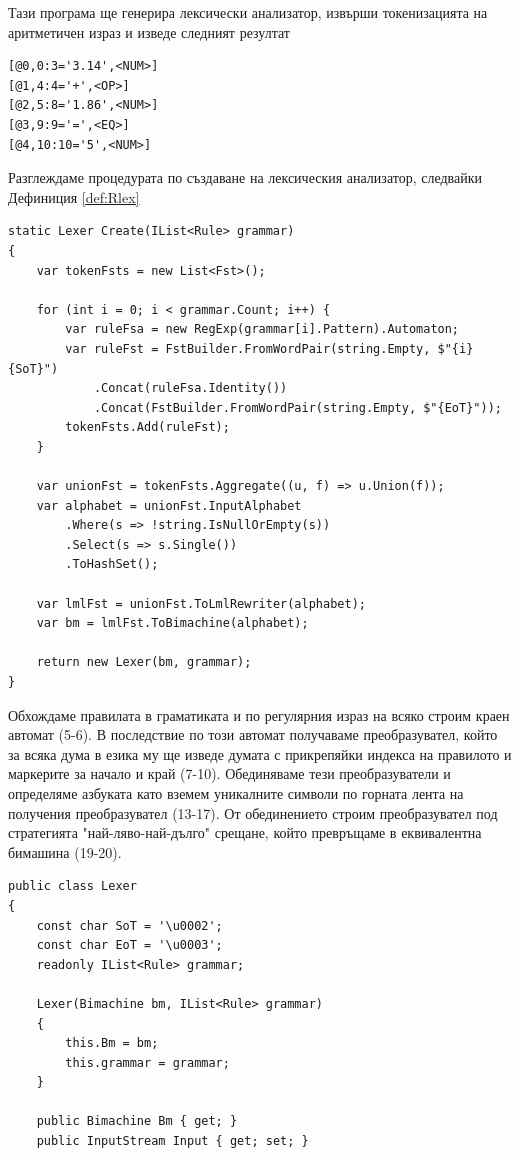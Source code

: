 \documentclass[12pt, oneside]{article}
\theoremstyle{definition}
\begin{document}
Тази програма ще генерира лексически анализатор, извърши токенизацията на аритметичен израз и изведе следният резултат

\begin{verbatim}
[@0,0:3='3.14',<NUM>]
[@1,4:4='+',<OP>]
[@2,5:8='1.86',<NUM>]
[@3,9:9='=',<EQ>]
[@4,10:10='5',<NUM>]
\end{verbatim}

Разглеждаме процедурата по създаване на лексическия анализатор, следвайки Дефиниция \ref{def:Rlex}

\begin{verbatim}
static Lexer Create(IList<Rule> grammar)
{
	var tokenFsts = new List<Fst>();

	for (int i = 0; i < grammar.Count; i++) {
		var ruleFsa = new RegExp(grammar[i].Pattern).Automaton;
		var ruleFst = FstBuilder.FromWordPair(string.Empty, $"{i}{SoT}")
			.Concat(ruleFsa.Identity())
			.Concat(FstBuilder.FromWordPair(string.Empty, $"{EoT}"));
		tokenFsts.Add(ruleFst);
	}

	var unionFst = tokenFsts.Aggregate((u, f) => u.Union(f));
	var alphabet = unionFst.InputAlphabet
		.Where(s => !string.IsNullOrEmpty(s))
		.Select(s => s.Single())
		.ToHashSet();

	var lmlFst = unionFst.ToLmlRewriter(alphabet);
	var bm = lmlFst.ToBimachine(alphabet);

	return new Lexer(bm, grammar);
}
\end{verbatim}

 Обхождаме правилата в граматиката и по регулярния израз на всяко строим краен автомат (5-6). В последствие по този автомат получаваме преобразувател, който за всяка дума в езика му ще изведе думата с прикрепяйки индекса на правилото и маркерите за начало и край (7-10). Обединяваме тези преобразуватели и определяме азбуката като вземем уникалните символи по горната лента на получения преобразувател (13-17). От обединението строим преобразувател под стратегията "най-ляво-най-дълго" срещане, който превръщаме в еквивалентна бимашина (19-20).

\begin{verbatim}
public class Lexer
{
	const char SoT = '\u0002';
	const char EoT = '\u0003';
	readonly IList<Rule> grammar;

	Lexer(Bimachine bm, IList<Rule> grammar) 
	{
        this.Bm = bm;
        this.grammar = grammar;
    }

    public Bimachine Bm { get; }
	public InputStream Input { get; set; }

\end{verbatim}
\end{document}
